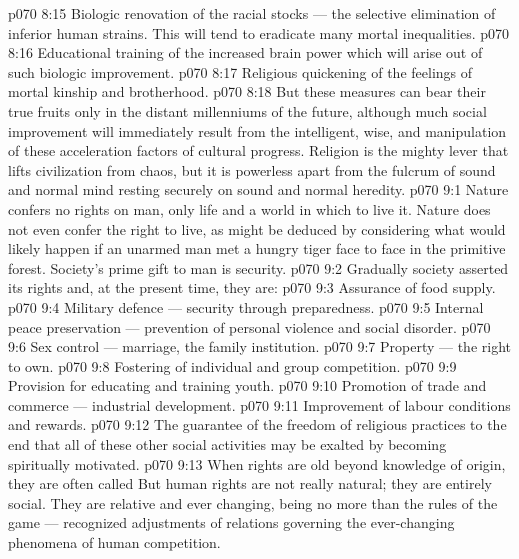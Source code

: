 \vs p070 8:15 \bibnobreakspace Biologic renovation of the racial stocks --- the selective elimination of inferior human strains. This will tend to eradicate many mortal inequalities.
\vs p070 8:16 \bibnobreakspace Educational training of the increased brain power which will arise out of such biologic improvement.
\vs p070 8:17 \bibnobreakspace Religious quickening of the feelings of mortal kinship and brotherhood.
\vs p070 8:18 \pc But these measures can bear their true fruits only in the distant millenniums of the future, although much social improvement will immediately result from the intelligent, wise, and  manipulation of these acceleration factors of cultural progress. Religion is the mighty lever that lifts civilization from chaos, but it is powerless apart from the fulcrum of sound and normal mind resting securely on sound and normal heredity.
\vs p070 9:1 Nature confers no rights on man, only life and a world in which to live it. Nature does not even confer the right to live, as might be deduced by considering what would likely happen if an unarmed man met a hungry tiger face to face in the primitive forest. Society’s prime gift to man is security.
\vs p070 9:2 \pc Gradually society asserted its rights and, at the present time, they are:
\vs p070 9:3 \bibnobreakspace Assurance of food supply.
\vs p070 9:4 \bibnobreakspace Military defence --- security through preparedness.
\vs p070 9:5 \bibnobreakspace Internal peace preservation --- prevention of personal violence and social disorder.
\vs p070 9:6 \bibnobreakspace Sex control --- marriage, the family institution.
\vs p070 9:7 \bibnobreakspace Property --- the right to own.
\vs p070 9:8 \bibnobreakspace Fostering of individual and group competition.
\vs p070 9:9 \bibnobreakspace Provision for educating and training youth.
\vs p070 9:10 \bibnobreakspace Promotion of trade and commerce --- industrial development.
\vs p070 9:11 \bibnobreakspace Improvement of labour conditions and rewards.
\vs p070 9:12 \bibnobreakspace The guarantee of the freedom of religious practices to the end that all of these other social activities may be exalted by becoming spiritually motivated.
\vs p070 9:13 \pc When rights are old beyond knowledge of origin, they are often called  But human rights are not really natural; they are entirely social. They are relative and ever changing, being no more than the rules of the game --- recognized adjustments of relations governing the ever\hyp{}changing phenomena of human competition.
